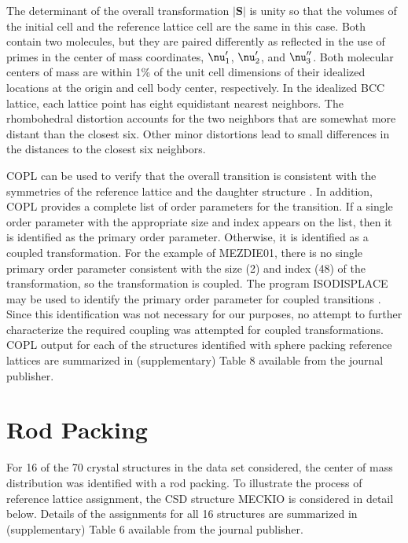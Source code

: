 \documentclass[preprint]{iucr}              %
\begin{document}
The determinant of the overall transformation $|\mathbf{S}|$ is unity so that the volumes of the initial cell and the reference lattice cell are the same in this case.  Both contain two molecules, but they are paired differently as reflected in the use of primes in the center of mass coordinates, 
$\mbox{\boldmath$\nu$}_{1}^{\prime}$, 
$\mbox{\boldmath$\nu$}_{2}^{\prime}$, and
$\mbox{\boldmath$\nu$}_{3}^{\prime\prime}$.
Both molecular centers of mass are within 1\% of the unit cell dimensions of their idealized locations at the origin and cell body center, respectively.  In the idealized BCC lattice, each lattice point has eight equidistant nearest neighbors.  The rhombohedral distortion accounts for the two neighbors that are somewhat more distant than the closest six.  Other minor distortions lead to small differences in the distances to the closest six neighbors.

COPL can be used to verify that the overall transition is consistent with the symmetries of the reference lattice and the daughter structure \cite{Stokes07}.  In addition, COPL provides a complete list of order parameters for the transition.  If a single order parameter with the appropriate size and index appears on the list, then it is identified as the primary order parameter.  Otherwise, it is identified as a coupled transformation.  For the example of MEZDIE01, there is no single primary order parameter consistent with the size (2) and index (48) of the transformation, so the transformation is coupled.  The program ISODISPLACE may be used to identify the primary order parameter for coupled transitions \cite{ISODISPLACE}.  Since this identification was not necessary for our purposes, no attempt to further characterize the required coupling was attempted for coupled transformations.  COPL output for each of the structures identified with sphere packing reference lattices are summarized in (supplementary) Table 8 available from the journal publisher.


\section{Rod Packing }

For 16 of the 70 crystal structures in the data set considered, the center of mass distribution was identified with a rod packing.  To illustrate the process of reference lattice assignment, the CSD structure MECKIO is considered in detail below.  Details of the assignments for all 16 structures are summarized in (supplementary) Table 6 available from the journal publisher.
\end{document}
